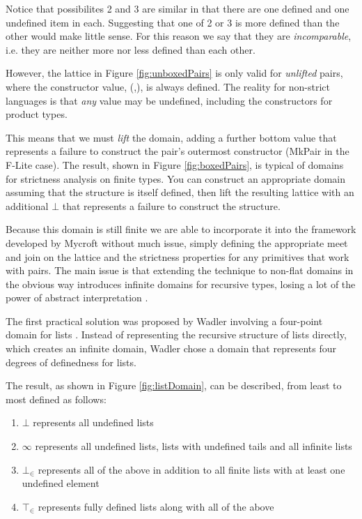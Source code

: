 Notice that possibilites 2 and 3 are similar in that there are one defined and
one undefined item in each. Suggesting that one of 2 or 3 is more defined than
the other would make little sense.  For this reason we say that they are
\emph{incomparable}, i.e. they are neither more nor less defined than each
other.

However, the lattice in Figure \ref{fig:unboxedPairs} is only valid for
\emph{unlifted} pairs, where the constructor value, \<(,)\>, is always defined.
The reality for non-strict languages is that \emph{any} value may be undefined,
including the constructors for product types.

This means that we must \emph{lift} the domain, adding a further bottom value
that represents a failure to construct the pair's outermost constructor
(\<MkPair\> in the F-Lite case). The result, shown in Figure
\ref{fig:boxedPairs}, is typical of domains for strictness analysis on finite
types. You can construct an appropriate domain assuming that the structure is
itself defined, then lift the resulting lattice with an additional $\bot$ that
represents a failure to construct the structure.

Because this domain is still finite we are able to incorporate it into the
framework developed by Mycroft without much issue, simply defining the
appropriate \<meet\> and \<join\> on the lattice and the strictness properties
for any primitives that work with pairs. The main issue is that extending the
technique to non-flat domains in the obvious way introduces infinite domains
for recursive types, losing a lot of the power of abstract interpretation
.

The first practical solution was proposed by Wadler involving a four-point
domain for lists \citep{wadler1987strictness}. Instead of representing the
recursive structure of lists directly, which creates an infinite domain, Wadler
chose a domain that represents four degrees of definedness for lists.

The result, as shown in Figure \ref{fig:listDomain}, can be described, from least
to most defined as follows:

\begin{enumerate}
    \item $\bot$ represents all undefined lists
    \item $\infty$ represents all undefined lists, lists  with undefined tails
        and all infinite lists
    \item $\bot_{\in}$ represents all of the above in addition to all finite
        lists with at least one undefined element
    \item $\top_{\in}$ represents fully defined lists along with all of the above
\end{enumerate}

